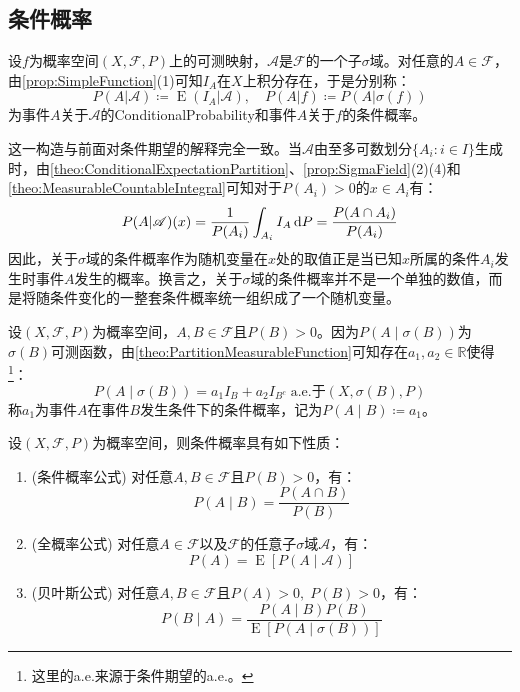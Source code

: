 \subsection{条件概率}
\begin{definition}
	设$f$为概率空间$(X,\mathscr{F},P)$上的可测映射，$\mathscr{A}$是$\mathscr{F}$的一个子$\sigma$域。对任意的$A\in\mathscr{F}$，由\cref{prop:SimpleFunction}(1)可知$I_A$在$X$上积分存在，于是分别称：
	\begin{equation*}
		P(A|\mathscr{A})\coloneq\operatorname{E}(I_A|\mathscr{A}),\quad P(A|f)\coloneq P(A|\sigma(f))
	\end{equation*}
	为事件$A$关于$\mathscr{A}$的\gls{ConditionalProbability}和事件$A$关于$f$的条件概率。
\end{definition}
这一构造与前面对条件期望的解释完全一致。当$\mathscr{A}$由至多可数划分$\{A_i:i\in I\}$生成时，由\cref{theo:ConditionalExpectationPartition}、\cref{prop:SigmaField}(2)(4)和\cref{theo:MeasurableCountableIntegral}可知对于$P(A_i)>0$的$x\in A_i$有：
\begin{equation*}
	P(A|\mathscr{A})(x)=\frac{1}{P(A_i)}\int_{A_i}I_A\mathop{}\!\mathrm{d} P=\frac{P(A\cap A_i)}{P(A_i)}
\end{equation*}
因此，关于$\sigma$域的条件概率作为随机变量在$x$处的取值正是当已知$x$所属的条件$A_i$发生时事件$A$发生的概率。换言之，关于$\sigma$域的条件概率并不是一个单独的数值，而是将随条件变化的一整套条件概率统一组织成了一个随机变量。
\begin{definition}
	设$(X,\mathscr{F},P)$为概率空间，$A,B\in\mathscr{F}$且$P(B)>0$。因为$P(A\mid\sigma(B))$为$\sigma(B)$可测函数，由\cref{theo:PartitionMeasurableFunction}可知存在$a_1,a_2\in\mathbb{R}$使得\footnote{这里的a.e.来源于条件期望的a.e.。}：
	\begin{equation*}
		P(A\mid\sigma(B))=a_1I_B+a_2I_{B^c}\;\text{a.e.于$(X,\sigma(B),P)$}
	\end{equation*}
	称$a_1$为事件$A$在事件$B$发生条件下的条件概率，记为$P(A\mid B)\coloneq a_1$。
\end{definition}
\begin{property}\label{prop:ConditionalProbability}
	设$(X,\mathscr{F},P)$为概率空间，则条件概率具有如下性质：
	\begin{enumerate}
		\item(条件概率公式) 对任意$A,B\in\mathscr{F}$且$P(B)>0$，有：
		\begin{equation*}
			P(A\mid B)=\frac{P(A\cap B)}{P(B)}
		\end{equation*}
		\item(全概率公式) 对任意$A\in\mathscr{F}$以及$\mathscr{F}$的任意子$\sigma$域$\mathscr{A}$，有：
		\begin{equation*}
			P(A)=\operatorname{E}[P(A\mid\mathscr{A})]
		\end{equation*}
		\item(贝叶斯公式) 对任意$A,B\in\mathscr{F}$且$P(A)>0,\;P(B)>0$，有：
		\begin{equation*}
			P(B\mid A)=\frac{P(A\mid B)P(B)}{\operatorname{E}[P(A\mid\sigma(B))]}
		\end{equation*}
	\end{enumerate}
\end{property}
